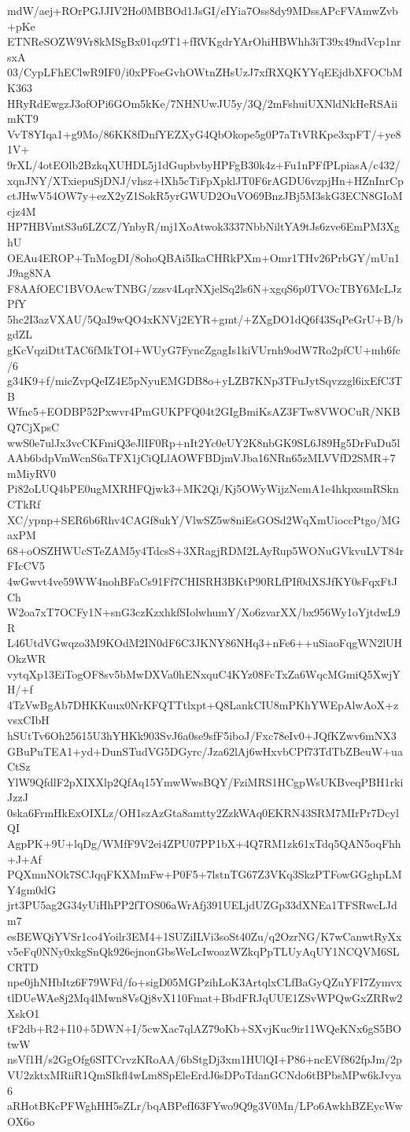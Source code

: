 mdW/aej+ROrPGJJIV2Ho0MBBOd1JsGI/eIYia7Oss8dy9MDssAPcFVAmwZvb+pKe
ETNReSOZW9Vr8kMSgBx01qz9T1+fRVKgdrYArOhiHBWhh3iT39x49ndVcp1nrsxA
03/CypLFhEClwR9IF0/i0xPFoeGvhOWtnZHsUzJ7xfRXQKYYqEEjdbXFOCbMK363
HRyRdEwgzJ3ofOPi6GOm5kKe/7NHNUwJU5y/3Q/2mFshuiUXNldNkHeRSAiimKT9
VvT8YIqa1+g9Mo/86KK8fDnfYEZXyG4QbOkope5g0P7aTtVRKpe3xpFT/+ye81V+
9rXL/4otEOlb2BzkqXUHDL5j1dGupbvbyHPFgB30k4z+Fu1nPFfPLpiasA/c432/
xqnJNY/XTxiepuSjDNJ/vhsz+lXh5cTiFpXpklJT0F6rAGDU6vzpjHn+HZnInrCp
ctJHwV54OW7y+ezX2yZ1SokR5yrGWUD2OuVO69BnzJBj5M3skG3ECN8GIoMcjz4M
HP7HBVmtS3u6LZCZ/YnbyR/mj1XoAtwok3337NbbNiltYA9tJs6zve6EmPM3XghU
OEAu4EROP+TnMogDI/8ohoQBAi5IkaCHRkPXm+Omr1THv26PrbGY/mUn1J9ag8NA
F8AAfOEC1BVOAcwTNBG/zzsv4LqrNXjelSq2ls6N+xgqS6p0TVOcTBY6McLJzPfY
5hc2I3azVXAU/5QaI9wQO4xKNVj2EYR+gmt/+ZXgDO1dQ6f43SqPeGrU+B/bgdZL
gKcVqziDttTAC6fMkTOI+WUyG7FyncZgagIs1kiVUrnh9odW7Ro2pfCU+mh6fc/6
g34K9+f/micZvpQeIZ4E5pNyuEMGDB8o+yLZB7KNp3TFuJytSqvzzgl6ixEfC3TB
Wfnc5+EODBP52Pxwvr4PmGUKPFQ04t2GIgBmiKsAZ3FTw8VWOCuR/NKBQ7CjXpsC
wwS0e7ulJx3vcCKFmiQ3eJlIF0Rp+nIt2Yc0eUY2K8nbGK9SL6J89Hg5DrFuDu5l
AAb6bdpVmWcnS6aTFX1jCiQLlAOWFBDjmVJba16NRn65zMLVVfD2SMR+7mMiyRV0
Pi82oLUQ4bPE0ugMXRHFQjwk3+MK2Qi/Kj5OWyWijzNemA1e4hkpxsmRSknCTkRf
XC/ypnp+SER6b6Rhv4CAGf8ukY/VlwSZ5w8niEsGOSd2WqXmUioccPtgo/MGaxPM
68+oOSZHWUcSTeZAM5y4TdcsS+3XRagjRDM2LAyRup5WONuGVkvuLVT84rFIcCV5
4wGwvt4ve59WW4nohBFaCs91Ff7CHISRH3BKtP90RLfPIf0dXSJfKY0sFqxFtJCh
W2oa7xT7OCFy1N+snG3czKzxhkfSIolwhumY/Xo6zvarXX/bx956Wy1oYjtdwL9R
L46UtdVGwqzo3M9KOdM2IN0dF6C3JKNY86NHq3+nFe6++uSiaoFqgWN2lUHOkzWR
vytqXp13EiTogOF8sv5bMwDXVa0hENxquC4KYz08FcTxZa6WqcMGmiQ5XwjYH/+f
4TzVwBgAb7DHKKuux0NrKFQTTtlxpt+Q8LankCIU8mPKhYWEpAlwAoX+zvsxCIbH
hSUtTv6Oh25615U3hYHKk903SvJ6a0se9sfF5iboJ/Fxc78eIv0+JQfKZwv6mNX3
GBuPuTEA1+yd+DunSTudVG5DGyrc/Jza62lAj6wHxvbCPf73TdTbZBeuW+uaCtSz
YlW9QfdlF2pXIXXlp2QfAq15YmwWwsBQY/FziMRS1HCgpWsUKBveqPBH1rkiJzzJ
0ska6FrmHkExOIXLz/OH1szAzGta8amtty2ZzkWAq0EKRN43SRM7MIrPr7DcylQI
AgpPK+9U+lqDg/WMfF9V2ei4ZPU07PP1bX+4Q7RM1zk61xTdq5QAN5oqFhh+J+Af
PQXmnNOk7SCJqqFKXMmFw+P0F5+7lstnTG67Z3VKq3SkzPTFowGGghpLMY4gm0dG
jrt3PU5ag2G34yUiHhPP2fTOS06aWrAfj391UELjdUZGp33dXNEa1TFSRwcLJdm7
esBEWQiYVSr1co4Yoilr3EM4+1SUZiILVi3soSt40Zu/q2OzrNG/K7wCanwtRyXx
v5eFq0NNy0xkgSnQk926ejnonGbsWeLcIwoazWZkqPpTLUyAqUY1NCQVM6SLCRTD
npe0jhNHbItz6F79WFd/fo+sigD05MGPzihLoK3ArtqlxCLfBaGyQZuYFI7Zymvx
tlDUeWAe8j2Mq4lMwn8VsQj8vX110Fmat+BbdFRJqUUE1ZSvWPQwGxZRRw2XskO1
tF2db+R2+I10+5DWN+I/5cwXac7qlAZ79oKb+SXvjKuc9ir11WQeKNx6gS5BOtwW
nsVf1H/s2GgOfg6SITCrvzKRoAA/6bStgDj3xm1HUlQI+P86+ncEVf862fpJm/2p
VU2zktxMRiiR1QmSIkfl4wLm8SpEleErdJ6sDPoTdanGCNdo6tBPbsMPw6kJvya6
aRHotBKcPFWghHH5sZLr/bqABPefI63FYwo9Q9g3V0Mn/LPo6AwkhBZEycWwOX6o
